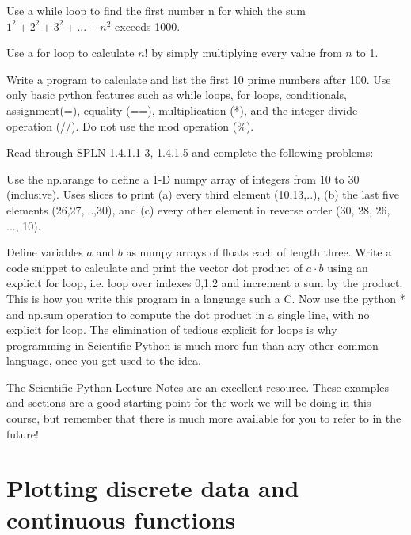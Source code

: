 \begin{plot}
Use a while loop to find the first number n for which the sum $1^2+2^2+3^2+...+n^2$ exceeds 1000.
\end{plot}

\begin{plot}
Use a for loop to calculate $n!$ by simply multiplying every value from $n$ to 1.
\end{plot}

\begin{plot}
Write a program to calculate and list the first 10 prime numbers after
100.  Use only basic python features such as while loops, for loops,
conditionals, assignment(=), equality (==), multiplication (*), and
the integer divide operation (//).  Do not use the mod operation (\%).
\end{plot}

Read through SPLN 1.4.1.1-3, 1.4.1.5 and complete the following problems:

\begin{plot}
Use the np.arange to define a 1-D numpy array of integers from 10 to
30 (inclusive).  Uses slices to print (a) every third element
(10,13,..), (b) the last five elements (26,27,...,30), and (c) every
other element in reverse order (30, 28, 26, ..., 10).
\end{plot}

\begin{plot}
Define variables $a$ and $b$ as numpy arrays of floats each of length
three.  Write a code snippet to calculate and print the vector dot
product of $a \cdot b$ using an explicit for loop, i.e. loop over
indexes 0,1,2 and increment a sum by the product.  This is how you
write this program in a language such a C.  Now use the python * and
np.sum operation to compute the dot product in a single line, with no
explicit for loop.  The elimination of tedious explicit for loops is
why programming in Scientific Python is much more fun than any other
common language, once you get used to the idea.
\end{plot}

The Scientific Python Lecture Notes are an excellent resource.  These
examples and sections are a good starting point for the work we will
be doing in this course, but remember that there is much more
available for you to refer to in the future!

\section{Plotting discrete data and continuous functions}

